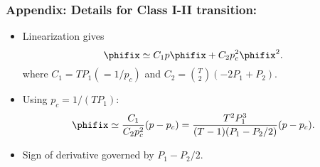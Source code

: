 \begin{frame}
  \frametitle{Appendix: Details for Class I-II transition:}

  \begin{itemize}
  \item<1->
    Linearization gives
    \begin{equation*}
      \label{gcontlong.eq:transIcalc2}
      \phifix
      \simeq
      C_1 p \phifix
      + C_2 p_c^2 \phifix^2.
    \end{equation*}
    where $C_1 = T P_1 (= 1/p_c)$ 
    and $C_2 = \binom{T}{2}(-2P_1 + P_2)$.
  \item<2->
    Using $p_c = 1/(TP_1)$:
    \begin{equation*}
      \label{gcontlong.eq:transIcalc3}
      \phifix 
      \simeq
      \frac{C_1}{C_2 p_c^2} (p-p_c)
      =
      \frac{T^2 P_1^3}{(T-1)(P_1 - P_2/2)} (p-p_c).
    \end{equation*}
  \item<3->
    Sign of derivative governed by $P_1 - P_2/2$.
  \end{itemize}
\end{frame}

